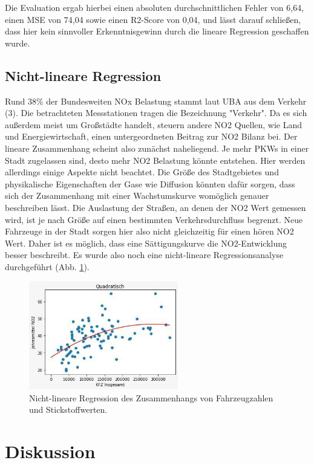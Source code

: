 \documentclass[11pt,a4paper,oneside,german]{article}
\begin{document}
	Die Evaluation ergab hierbei einen absoluten durchschnittlichen Fehler von 6,64, einen MSE von 74,04 sowie einen R2-Score von 0,04, und lässt darauf schließen, dass hier kein sinnvoller Erkenntnisgewinn durch die lineare Regression geschaffen wurde.
	
	\subsection{Nicht-lineare Regression}
	
	Rund 38\% der Bundesweiten NOx Belastung stammt laut UBA aus dem Verkehr (3). Die betrachteten Messstationen tragen die Bezeichnung "Verkehr". Da es sich außerdem meist um Großstädte handelt, steuern andere NO2 Quellen, wie Land und Energiewirtschaft, einen untergeordneten Beitrag zur NO2 Bilanz bei. Der lineare Zusammenhang scheint also zunächst naheliegend. Je mehr PKWs in einer Stadt zugelassen sind, desto mehr NO2 Belastung könnte entstehen. Hier werden allerdings einige Aspekte nicht beachtet. Die Größe des Stadtgebietes und physikalische Eigenschaften der Gase wie Diffusion könnten dafür sorgen, dass sich der Zusammenhang mit einer Wachstumskurve womöglich genauer beschreiben lässt. Die Auslastung der Straßen, an denen der NO2 Wert gemessen wird, ist je nach Größe auf einen bestimmten Verkehrsdurchfluss begrenzt. Neue Fahrzeuge in der Stadt sorgen hier also nicht gleichzeitig für einen hören NO2 Wert. Daher ist es möglich, dass eine Sättigungskurve die NO2-Entwicklung besser beschreibt. Es wurde also noch eine nicht-lineare Regressionsanalyse durchgeführt (Abb. \ref{fig:nonlinreg}).
	
	\begin{figure}[H]
	\centering
	\includegraphics[width=6.5cm]{nonlinreg.jpg}
	\caption{Nicht-lineare Regression des Zusammenhangs von Fahrzeugzahlen und Stickstoffwerten.}
	\label{fig:nonlinreg}
	\end{figure}
	
	\section{Diskussion}
	
\end{document}
